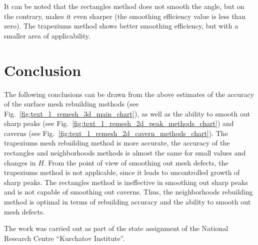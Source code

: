 \documentclass[
11pt,%
tightenlines,%
twoside,%
onecolumn,%
nofloats,%
nobibnotes,%
nofootinbib,%
superscriptaddress,%
noshowpacs,%
centertags]%
{revtex4}
\begin{document}
It can be noted that the rectangles method does not smooth the angle, but on the contrary, makes it even sharper (the smoothing efficiency value is less than zero).
The trapeziums method shows better smoothing efficiency, but with a smaller area of ​​applicability.


\section{Conclusion}

The following conclusions can be drawn from the above estimates of the accuracy of the surface mesh rebuilding methods (see Fig.~\ref{fig:text_1_remesh_3d_main_chart}), as well as the ability to smooth out sharp peaks (see Fig.~\ref{fig:text_1_remesh_2d_peak_methods_chart}) and caverns (see Fig.~\ref{fig:text_1_remesh_2d_cavern_methods_chart}).
The trapeziums mesh rebuilding method is more accurate, the accuracy of the rectangles and neighborhoods methods is almost the same for small values ​​and changes in $H$.
From the point of view of smoothing out mesh defects, the trapeziums method is not applicable, since it leads to uncontrolled growth of sharp peaks.
The rectangles method is ineffective in smoothing out sharp peaks and is not capable of smoothing out caverns.
Thus, the neighborhoods rebuilding method is optimal in terms of rebuilding accuracy and the ability to smooth out mesh defects.


\begin{acknowledgments}
The work was carried out as part of the state assignment of the National Research Centre \textquotedblleft Kurchatov Institute\textquotedblright.

\end{acknowledgments}

%
%
\end{document}
